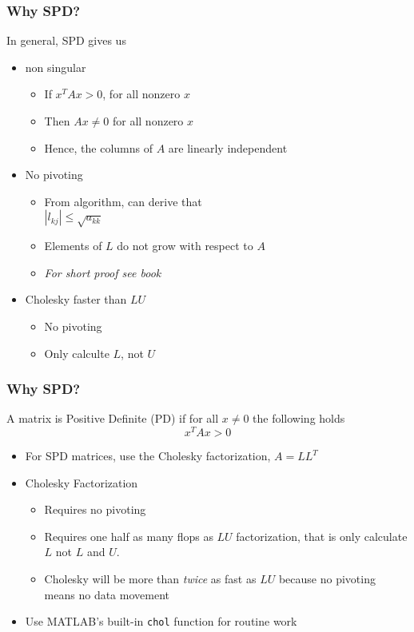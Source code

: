 \documentclass[10pt]{beamer}
\begin{document}
\begin{frame}
\frametitle{Why SPD?}
In general, SPD gives us
\begin{itemize} 
    \item non singular
    \begin{itemize}
        \item If $x^T A x > 0$, for all nonzero $x$
        \item Then $A x \neq 0$ for all nonzero $x$
        \item Hence, the columns of $A$ are linearly independent
    \end{itemize}
    \item No pivoting
    \begin{itemize}
        \item From algorithm, can derive that\\
              $|l_{k j}| \leq \sqrt{a_{k k}}$
        \item Elements of $L$ do not grow with respect to $A$
        \item \emph{For short proof see book}
    \end{itemize}
    \item Cholesky faster than $LU$
    \begin{itemize}
        \item No pivoting
        \item Only calculte $L$, not $U$
    \end{itemize}
\end{itemize}
\end{frame}
 \begin{frame}
 \frametitle{Why SPD?}
A matrix is Positive Definite (PD) if for all $x\ne0$ the following holds
\[ x^T A x > 0 \]
 \begin{itemize}
    \item   For SPD matrices, use the Cholesky factorization,
            $A = L L^T$
    \item   Cholesky Factorization
    \begin{itemize}
        \item Requires no pivoting 
        \item Requires one half as many flops as $LU$ factorization, that is only calculate $L$ not $L$ and $U$.
        \item Cholesky will be more than \emph{twice} as fast as $LU$ because no pivoting means no data movement
    \end{itemize}
    \item   Use MATLAB's built-in \texttt{chol} function for routine work
 \end{itemize} 
 \end{frame}
\end{document}
